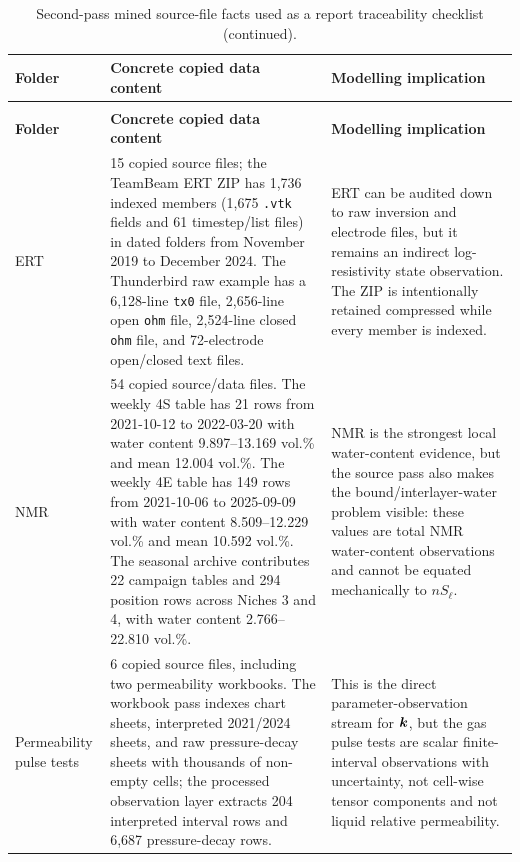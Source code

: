 \begin{longtable}{P{2.7cm} P{6.1cm} P{6.6cm}}
\caption{Second-pass mined source-file facts used as a report traceability checklist.}
\label{tab:source-content-pass}\\
\toprule
\textbf{Folder} & \textbf{Concrete copied data content} & \textbf{Modelling implication}\\
\midrule
\endfirsthead
\caption[]{Second-pass mined source-file facts used as a report traceability checklist (continued).}\\
\toprule
\textbf{Folder} & \textbf{Concrete copied data content} & \textbf{Modelling implication}\\
\midrule
\endhead
\bottomrule
\endlastfoot

ERT &
15 copied source files; the TeamBeam ERT ZIP has 1,736 indexed members
(1,675 \texttt{.vtk} fields and 61 timestep/list files) in dated folders from
November 2019 to December 2024.  The Thunderbird raw example has a 6,128-line
\texttt{tx0} file, 2,656-line open \texttt{ohm} file, 2,524-line closed
\texttt{ohm} file, and 72-electrode open/closed text files. &
ERT can be audited down to raw inversion and electrode files, but it remains an
indirect log-resistivity state observation.  The ZIP is intentionally retained
compressed while every member is indexed.\\

NMR &
54 copied source/data files.  The weekly 4S table has 21 rows from
2021-10-12 to 2022-03-20 with water content 9.897--13.169 vol.\% and mean
12.004 vol.\%.  The weekly 4E table has 149 rows from 2021-10-06 to
2025-09-09 with water content 8.509--12.229 vol.\% and mean 10.592 vol.\%.
The seasonal archive contributes 22 campaign tables and 294 position rows across
Niches 3 and 4, with water content 2.766--22.810 vol.\%. &
NMR is the strongest local water-content evidence, but the source pass also makes
the bound/interlayer-water problem visible: these values are total NMR water-content
observations and cannot be equated mechanically to \(nS_\ell\).\\

Permeability pulse tests &
6 copied source files, including two permeability workbooks.  The workbook pass
indexes chart sheets, interpreted 2021/2024 sheets, and raw pressure-decay sheets
with thousands of non-empty cells; the processed observation layer extracts
204 interpreted interval rows and 6,687 pressure-decay rows. &
This is the direct parameter-observation stream for \(\bm{k}\), but the gas pulse
tests are scalar finite-interval observations with uncertainty, not cell-wise tensor
components and not liquid relative permeability.\\


\end{longtable}
